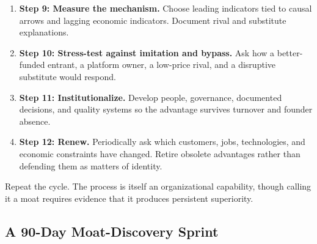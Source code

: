 \begin{enumerate}
    \item \textbf{Step 9: Measure the mechanism.} Choose leading indicators tied to causal arrows and lagging economic indicators. Document rival and substitute explanations.
    \item \textbf{Step 10: Stress-test against imitation and bypass.} Ask how a better-funded entrant, a platform owner, a low-price rival, and a disruptive substitute would respond.
    \item \textbf{Step 11: Institutionalize.} Develop people, governance, documented decisions, and quality systems so the advantage survives turnover and founder absence.
    \item \textbf{Step 12: Renew.} Periodically ask which customers, jobs, technologies, and economic constraints have changed. Retire obsolete advantages rather than defending them as matters of identity.
\end{enumerate}

Repeat the cycle. The process is itself an organizational capability, though calling it a moat requires evidence that it produces persistent superiority.

\subsection{A 90-Day Moat-Discovery Sprint}
\label{sec:ninety_day_moat_sprint}

